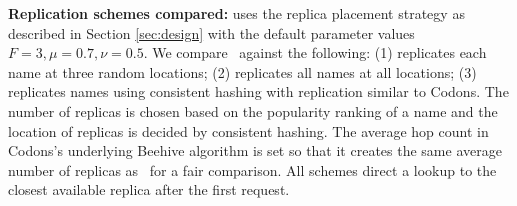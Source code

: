 {\textbf{Replication schemes compared:}}
\textbf{\auspice} uses the replica placement strategy as described in Section \ref{sec:design} with the default parameter values $F=3, \mu = 0.7, \nu = 0.5$. %
We compare \auspice\ against the following: (1) \textbf{\staticthree} replicates each name at three random locations; (2) \textbf{\replicateall} replicates all names at all locations; (3) \textbf{\codons} replicates names using consistent hashing with replication similar to Codons\cite{codons-paper}. The number of replicas is chosen based on the popularity ranking of a name and  the location of replicas is decided by consistent hashing. The average hop count in Codons's underlying Beehive algorithm  is set so that it creates the same average number of replicas as \auspice\ for a fair comparison. All schemes direct a lookup to the closest available replica after the first request.



